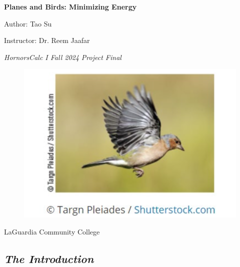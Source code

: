 \documentclass{article}
\begin{document}
\begin{titlepage}
    \centering
    \vspace*{1cm}
    
    \Huge
    \textbf{Planes and Birds: Minimizing Energy}
    
    \vspace{0.5cm}
    
    \Large
    Author: Tao Su
    
    \vspace{0.5cm}
    
    \large
    Instructor: Dr. Reem Jaafar
    
    \vspace{1.5cm}
    
    \textit{HornorsCalc I Fall 2024 Project Final}
    
    \vfill

    \begin{figure}[h]
        \centering
        \includegraphics[width=1\textwidth]{coverPage.png}
    \end{figure}
    
    \vspace{1cm}
    \Large
    LaGuardia Community College
\end{titlepage}

\newpage

\subsection*{\itshape \large The Introduction}
\end{document}
